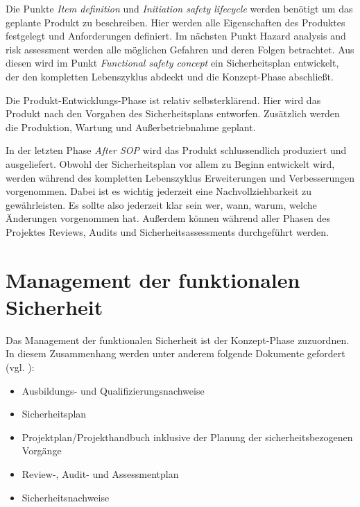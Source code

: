 \documentclass[a4paper,DIV=calc,ngerman]{scrartcl}
\begin{document}
Die Punkte \emph{Item definition} und \emph{Initiation safety lifecycle} werden benötigt um das geplante Produkt zu beschreiben. Hier werden alle Eigenschaften des Produktes festgelegt und Anforderungen definiert. Im nächsten Punkt {Hazard analysis and risk assessment} werden alle möglichen Gefahren und deren Folgen betrachtet. Aus diesen wird im Punkt \emph{Functional safety concept} ein Sicherheitsplan entwickelt, der den kompletten Lebenszyklus abdeckt und die Konzept-Phase abschließt. 

Die Produkt-Entwicklungs-Phase ist relativ selbsterklärend. Hier wird das Produkt nach den Vorgaben des Sicherheitsplans entworfen. Zusätzlich werden die Produktion, Wartung und Außerbetriebnahme geplant.

In der letzten Phase \emph{After SOP} wird das Produkt schlussendlich produziert und ausgeliefert. Obwohl der Sicherheitsplan vor allem zu Beginn entwickelt wird, werden während des kompletten Lebenszyklus Erweiterungen und Verbesserungen vorgenommen. Dabei ist es wichtig jederzeit eine Nachvollziehbarkeit zu gewährleisten. Es sollte also jederzeit klar sein wer, wann, warum, welche Änderungen vorgenommen hat. Außerdem können während aller Phasen des Projektes Reviews, Audits und Sicherheitsassessments durchgeführt werden. \cite[S. 121]{1}





\section{Management der funktionalen Sicherheit}
\label{sec:Management}
Das Management der funktionalen Sicherheit ist der Konzept-Phase zuzuordnen. In diesem Zusammenhang werden unter anderem folgende Dokumente gefordert (vgl. \cite[S. 121]{1}):

\begin{itemize}
    \item Ausbildungs- und Qualifizierungsnachweise
    \item Sicherheitsplan
    \item Projektplan/Projekthandbuch inklusive der Planung der sicherheitsbezogenen Vorgänge
    \item Review-, Audit- und Assessmentplan
    \item Sicherheitsnachweise
\end{itemize}
\end{document}
